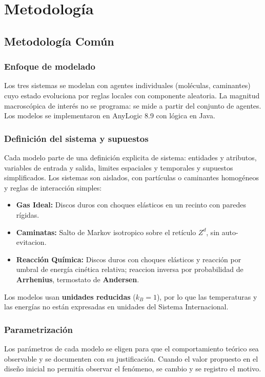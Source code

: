 \documentclass{article}
\begin{document}
\section{Metodología}

\subsection{Metodología Común}

\subsubsection{Enfoque de modelado}
Los tres sistemas se modelan con agentes individuales (moléculas, caminantes) cuyo estado evoluciona por reglas locales con componente aleatoria. La magnitud macroscópica de interés no se programa: se mide a partir del conjunto de agentes.
Los modelos se implementaron en AnyLogic 8.9 con lógica en Java.

\subsubsection{Definición del sistema y supuestos}
Cada modelo parte de una definición explicita de sistema: entidades y atributos, variables de entrada y salida, limites espaciales y temporales y supuestos simplificados. Los sistemas son aislados, con partículas o caminantes homogéneos y reglas de interacción simples:
\begin{itemize}
    \item \textbf{Gas Ideal:} Discos duros con choques elásticos en un recinto con paredes rígidas.
    \item \textbf{Caminatas:} Salto de Markov isotropico sobre el retículo $Z^d$, sin auto-evitacion.
    \item \textbf{Reacción Química:} Discos duros con choques elásticos y reacción por umbral de energía cinética relativa; reaccion inversa por probabilidad de \textbf{Arrhenius}, termostato de \textbf{Andersen}.
\end{itemize}
Los modelos usan \textbf{unidades reducidas} ($k_B=1$), por lo que las temperaturas y las energías no están expresadas en unidades del Sistema Internacional.

\subsubsection{Parametrización}
Los parámetros de cada modelo se eligen para que el comportamiento teórico sea observable y se documenten con su justificación. Cuando el valor propuesto en el diseño inicial no permitía observar el fenómeno, se cambio y se registro el motivo.
\end{document}
